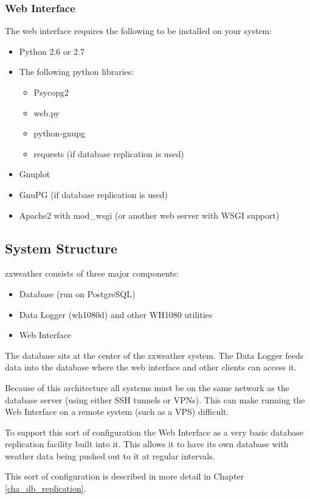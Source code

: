 \documentclass[a4paper,10pt,draft]{book}
\begin{document}
\subsubsection{Web Interface}
The web interface requires the following to be installed on your system:
\begin{itemize}
\item Python 2.6 or 2.7
\item The following python libraries: 
\begin{itemize}
\item Psycopg2
\item web.py
\item python-gnupg
\item requests (if database replication is used)
\end{itemize}
\item Gnuplot
\item GnuPG (if database replication is used)
\item Apache2 with mod\_wsgi (or another web server with WSGI support)
\end{itemize}

\subsection{System Structure}
zxweather consists of three major components:
\begin{itemize}
\item Database (run on PostgreSQL)
\item Data Logger (wh1080d) and other WH1080 utilities
\item Web Interface
\end{itemize}

The database sits at the center of the zxweather system. The Data Logger feeds data into the database where the web interface and other clients can access it.

Because of this architecture all systems must be on the same network as the database server (using either SSH tunnels or VPNs). This can make running the Web Interface on a remote system (such as a VPS) difficult.

To support this sort of configuration the Web Interface as a very basic database replication facility built into it. This allows it to have its own database with weather data being pushed out to it at regular intervals.

This sort of configuration is described in more detail in Chapter \ref{cha_db_replication}.
\end{document}
